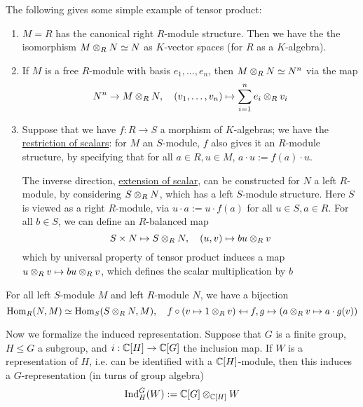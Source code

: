\begin{example}
    The following gives some simple example of tensor product:
    \begin{enumerate}[label=\arabic*)]
        \item $M = R$ has the canonical right $R$-module structure. Then we have the the isomorphism $M \otimes_R N \simeq N$ as $K$-vector spaces (for $R$ as a $K$-algebra).
        \item If $M$ is a free $R$-module with basis $e_1, \dots, e_n$, then $M \otimes_R N \simeq N^n$ via the map
        \[
            N^n \to M \otimes_R N, \quad (v_1, \dots, v_n) \mapsto \sum_{i = 1}^n e_i \otimes_R v_i
        \]
        \item Suppose that we have $f: R \to S$ a morphism of $K$-algebras; we have the \underline{restriction of scalars}: for $M$ an $S$-module, $f$ also gives it an $R$-module structure, by specifying that for all $a \in R, u \in M$, $a \cdot u := f(a) \cdot u$. 
        
        The inverse direction, \underline{extension of scalar}, can be constructed for $N$ a left $R$-module, by considering $S \otimes_R N$, which has a left $S$-module structure. Here $S$ is viewed as a right $R$-module, via $u \cdot a := u \cdot f(a)$ for all $u \in S, a \in R$. For all $b \in S$, we can define an $R$-balanced map
        \[
            S \times N \mapsto S \otimes_R N, \quad (u, v) \mapsto bu \otimes_R v
        \]
        which by universal property of tensor product induces a map $u \otimes_R v \mapsto bu \otimes_R v$, which defines the scalar multiplication by $b$
    \end{enumerate}
\end{example}

\begin{proposition}\label{prop: Universal Property of Extension of Scalar}
    For all left $S$-module $M$ and left $R$-module $N$, we have a bijection
    \[
        \mathrm{Hom}_R(N, M) \simeq \mathrm{Hom}_S(S \otimes_R N, M), \quad f \circ (v \mapsto 1 \otimes_R v) \mapsfrom f, g \mapsto (a \otimes_R v \mapsto a \cdot g(v))
    \]
\end{proposition}

\textstart
Now we formalize the induced representation. Suppose that $G$ is a finite group, $H \leq G$ a subgroup, and $i: \mathbb{C}[H] \to \mathbb{C}[G]$ the inclusion map. If $W$ is a representation of $H$, i.e. can be identified with a $\mathbb{C}[H]$-module, then this induces a $G$-representation (in turns of group algebra)
\[
    \mathrm{Ind}_H^G (W) := \mathbb{C}[G] \otimes_{\mathbb{C}[H]} W
\]

